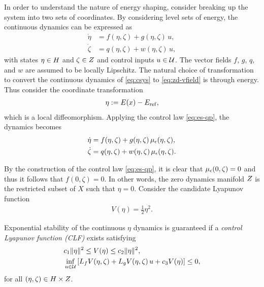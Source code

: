 \documentclass[twocolumn]{article}
\begin{document}
In order to understand the nature of energy shaping, consider breaking up the system into two sets of coordinates.
%
By considering level sets of energy, the continuous dynamics can be expressed as
\begin{align}
  \nonumber
  \dot \eta &= f(\eta, \zeta) + g(\eta, \zeta) \, u,\\
  \dot \zeta &= q(\eta, \zeta) + w(\eta, \zeta) \, u,
  \label{eq:zd-vfield}
\end{align}
%
with states $\eta \in H$ and $\zeta \in Z$ and control inputs $u \in \mathcal{U}$.
%
The vector fields $f$, $g$, $q$, and $w$ are assumed to be locally Lipschitz.
%
The natural choice of transformation to convert the continuous dynamics of \eqref{eq:csys} to \eqref{eq:zd-vfield} is through energy.
%
Thus consider the coordinate transformation
\begin{align}
  \eta := E(x) - E_{\mathrm{ref}},
\end{align}
which is a local diffeomorphism.
%
Applying the control law \eqref{eq:es-qp}, the dynamics becomes
\begin{align}
  \nonumber
  \dot \eta &= f(\eta, \zeta) + g(\eta, \zeta) \, \mu_{\epsilon}(\eta, \zeta),\\
  \dot \zeta &= q(\eta, \zeta) + w(\eta, \zeta) \, \mu_{\epsilon}(\eta, \zeta).
  \label{eq:zd-vfield-cl}
\end{align}

By the construction of the control law \eqref{eq:es-qp}, it is clear that $\mu_{\epsilon}(0, \zeta) = 0$ and thus it follows that $f(0, \zeta) = 0$.
%
In other words, the zero dynamics manifold $Z$ is the restricted subset of $X$ such that $\eta = 0$.
%
Consider the candidate Lyapunov function
\begin{align}
  V(\eta) = \frac{1}{2} \eta^{2}.
\end{align}

\begin{proposition}  
  Exponential stability of the continuous $\eta$ dynamics is guaranteed if a {\em control Lyapunov function (CLF)} exists satisfying
  \begin{align}
    \label{eq:lyap-cond-nrg-es}
    &c_{1} \| \eta \|^{2} \leq V(\eta) \leq c_{2} \| \eta \|^2,\\
    \nonumber
    &\inf_{u \in \mathcal{U}} \left[ L_{f} V(\eta, \zeta) + L_{g} V(\eta, \zeta) \, u + c_{3} V(\eta) \right] \leq 0,
  \end{align}
  for all $(\eta, \zeta) \in H \times Z$.
\end{proposition}
\end{document}

